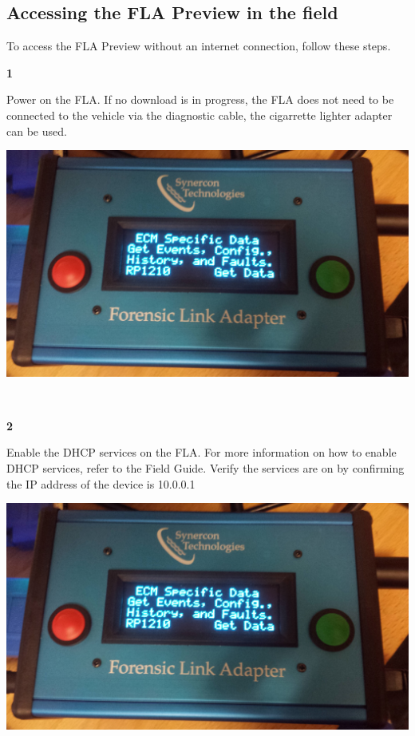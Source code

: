 \documentclass[11pt]{article}
\begin{document}
\subsection{Accessing the FLA Preview in the field}
To access the FLA Preview without an internet connection, follow these steps.\\[\baselineskip]
\noindent\begin{minipage}{0.3\textwidth}%
\begin{center}
\textbf{1}\\[\baselineskip]
\end{center}
Power on the FLA. If no download is in progress, the FLA does not need to be connected to the vehicle via the diagnostic cable, the cigarrette lighter adapter can be used.
\end{minipage}%
\hfill%
\begin{minipage}{0.6\textwidth}
\includegraphics[width=\linewidth]{../../media/fla_screens/ecm_confirm}
\end{minipage}\\[\baselineskip]
\noindent\begin{minipage}{0.3\textwidth}%
\begin{center}
\textbf{2}\\[\baselineskip]
\end{center}
Enable the DHCP services on the FLA. For more information on how to enable DHCP services, refer to the Field Guide. Verify the services are on by confirming the IP address of the device is 10.0.0.1
\end{minipage}%
\hfill%
\begin{minipage}{0.6\textwidth}
\includegraphics[width=\linewidth]{../../media/fla_screens/ecm_confirm}
\end{minipage}\\[\baselineskip]
\end{document}
